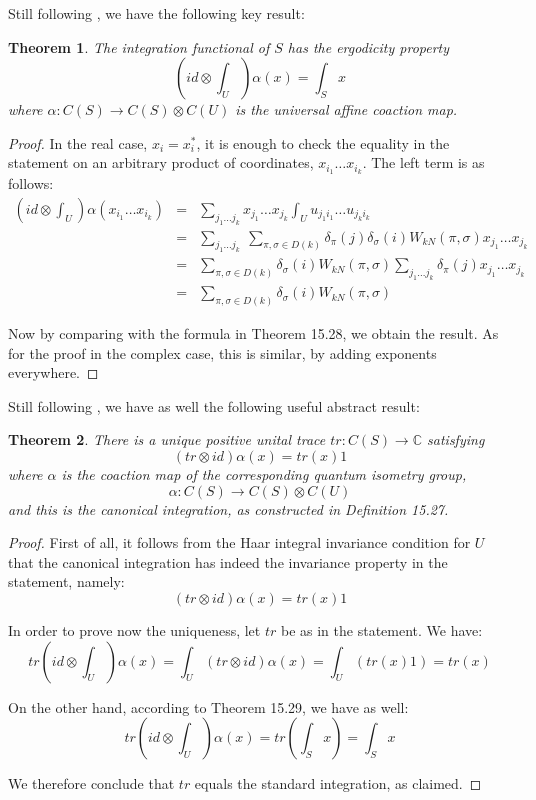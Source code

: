 \documentclass[12pt]{amsbook}
\newtheorem{theorem}{Theorem}[chapter]
\begin{document}
Still following \cite{bgo}, we have the following key result:


\begin{theorem}
The integration functional of $S$ has the ergodicity property
$$\left(id\otimes\int_U\right)\alpha(x)=\int_Sx$$
where $\alpha:C(S)\to C(S)\otimes C(U)$ is the universal affine coaction map.
\end{theorem}

\begin{proof}
In the real case, $x_i=x_i^*$, it is enough to check the equality in the statement on an arbitrary product of coordinates, $x_{i_1}\ldots x_{i_k}$. The left term is as follows:
\begin{eqnarray*}
\left(id\otimes\int_U\right)\alpha(x_{i_1}\ldots x_{i_k})
&=&\sum_{j_1\ldots j_k}x_{j_1}\ldots x_{j_k}\int_Uu_{j_1i_1}\ldots u_{j_ki_k}\\
&=&\sum_{j_1\ldots j_k}\ \sum_{\pi,\sigma\in D(k)}\delta_\pi(j)\delta_\sigma(i)W_{kN}(\pi,\sigma)x_{j_1}\ldots x_{j_k}\\
&=&\sum_{\pi,\sigma\in D(k)}\delta_\sigma(i)W_{kN}(\pi,\sigma)\sum_{j_1\ldots j_k}\delta_\pi(j)x_{j_1}\ldots x_{j_k}\\
&=&\sum_{\pi,\sigma\in D(k)}\delta_\sigma(i)W_{kN}(\pi,\sigma)
\end{eqnarray*}

Now by comparing with the formula in Theorem 15.28, we obtain the result. As for the proof in the complex case, this is similar, by adding exponents everywhere.
\end{proof} 

Still following \cite{bgo}, we have as well the following useful abstract result:


\begin{theorem}
There is a unique positive unital trace $tr:C(S)\to\mathbb C$ satisfying
$$(tr\otimes id)\alpha(x)=tr(x)1$$
where $\alpha$ is the coaction map of the corresponding quantum isometry group,
$$\alpha:C(S)\to C(S)\otimes C(U)$$
and this is the canonical integration, as constructed in Definition 15.27.
\end{theorem}

\begin{proof}
First of all, it follows from the Haar integral invariance condition for $U$ that the canonical integration has indeed the invariance property in the statement, namely:
$$(tr\otimes id)\alpha(x)=tr(x)1$$

In order to prove now the uniqueness, let $tr$ be as in the statement. We have:
$$tr\left(id\otimes\int_U\right)\alpha(x)
=\int_U(tr\otimes id)\alpha(x)
=\int_U(tr(x)1)
=tr(x)$$

On the other hand, according to Theorem 15.29, we have as well:
$$
tr\left(id\otimes\int_U\right)\alpha(x)
=tr\left(\int_Sx\right)
=\int_Sx$$

We therefore conclude that $tr$ equals the standard integration, as claimed.
\end{proof}
\end{document}
